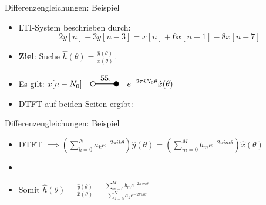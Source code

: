 \documentclass[14pt, aspectratio=169, handout]{beamer}
\newcommand{\transform}[2]{%
    \begin{tikzpicture}
        \draw[thick] (0,0) circle (0.1);
        \draw[thick] (0.1,0) -- (#2,0) node[midway, above] {#1};
        \filldraw[thick] (#2,0) circle (0.1);
    \end{tikzpicture}%
}
\begin{document}
\begin{frame}{Differenzengleichungen: Beispiel}
    \begin{itemize}
        \item LTI-System beschrieben durch:
        $$2 y[n] - 3y[n-3] = x[n] + 6x[n-1] - 8x[n-7]$$
        \item \textbf{Ziel}: Suche $\hat{h}(\theta) = \displaystyle\frac{\hat{y}(\theta)}{\hat{x}(\theta)}$. 
        \item Es gilt: $x[n-N_0] \hspace{10pt} \displaystyle\transform{55.}{1} \hspace{10pt}\displaystyle e^{-2 \pi i N_0 \theta} \hat{x}(\theta)$
        \item DTFT auf beiden Seiten ergibt:
    \end{itemize}
\end{frame}

\begin{frame}{Differenzengleichungen: Beispiel}
    \begin{itemize}
        \item DTFT $\implies \displaystyle\left( \displaystyle\sum_{k=0}^N a_k e^{-2\pi i k \theta}\right)\hat{y}(\theta) = \displaystyle\left( \displaystyle\sum_{m=0}^M b_m e^{-2 \pi i m \theta}\right)\hat{x}(\theta)$
        \item[] 
        \item Somit $\hat{h}(\theta)= \displaystyle\frac{\hat{y}(\theta)}{\hat{x}(\theta)} = \displaystyle\frac{\displaystyle\sum_{m=0}^M b_m e^{-2 \pi i m \theta}}{ \displaystyle\sum_{k=0}^N a_k e^{-2\pi i k \theta}}
    $
    \end{itemize}
\end{frame}
\end{document}
